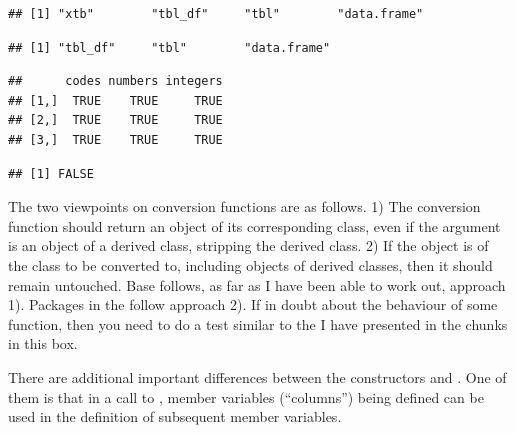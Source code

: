 \documentclass[krantz2]{krantz}\usepackage{knitr}%
\begin{document}
\begin{explainbox}
\begin{knitrout}\footnotesize
{}\color{fgcolor}\begin{kframe}
\begin{alltt}
 \hlkwb{<-} 
 \hlkwb{<-} \hlstd{(}\hlstd{,} 
\end{alltt}
\begin{verbatim}
## [1] "xtb"        "tbl_df"     "tbl"        "data.frame"
\end{verbatim}
\begin{alltt}
 \hlkwb{<-} 
\end{alltt}
\begin{verbatim}
## [1] "tbl_df"     "tbl"        "data.frame"
\end{verbatim}
\begin{alltt}
 \hlopt{==} 
\end{alltt}
\begin{verbatim}
##      codes numbers integers
## [1,]  TRUE    TRUE     TRUE
## [2,]  TRUE    TRUE     TRUE
## [3,]  TRUE    TRUE     TRUE
\end{verbatim}
\begin{alltt}
\end{alltt}
\begin{verbatim}
## [1] FALSE
\end{verbatim}
\end{kframe}
\end{knitrout}

The two viewpoints on conversion functions are as follows. 1) The conversion function should return an object of its corresponding class, even if the argument is an object of a derived class, stripping the derived class. 2) If the object is of the class to be converted to, including objects of derived classes, then it should remain untouched. Base \Rlang follows, as far as I have been able to work out, approach 1). Packages in the  follow approach 2). If in doubt about the behaviour of some function, then you need to do a test similar to the I have presented in the chunks in this box.
\end{explainbox}

There are additional important differences between the constructors  and . One of them is that in a call to , member variables (``columns'')  being defined can be used in the definition of subsequent member variables.
\end{document}
